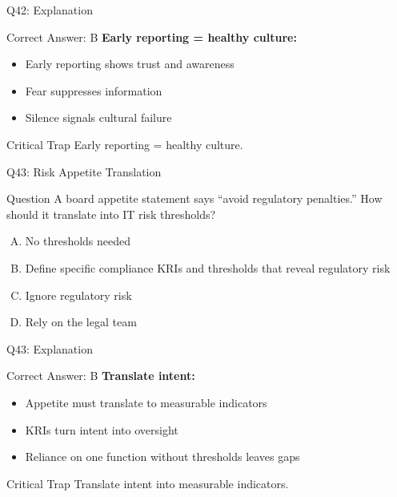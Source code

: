 \documentclass{beamer}
\begin{document}
	\begin{frame}{Q42: Explanation}
		\begin{block}{Correct Answer: B}
			\textbf{Early reporting = healthy culture:}
			\begin{itemize}
				\item Early reporting shows trust and awareness
				\item Fear suppresses information
				\item Silence signals cultural failure
			\end{itemize}
		\end{block}
		\begin{alertblock}{Critical Trap}
			Early reporting = healthy culture.
		\end{alertblock}
	\end{frame}
	
	\begin{frame}{Q43: Risk Appetite Translation}
		\begin{block}{Question}
			A board appetite statement says ``avoid regulatory penalties.'' How should it translate into IT risk thresholds?
		\end{block}
		\begin{enumerate}[(A)]
			\item No thresholds needed
			\item Define specific compliance KRIs and thresholds that reveal regulatory risk
			\item Ignore regulatory risk
			\item Rely on the legal team
		\end{enumerate}
	\end{frame}
	
	\begin{frame}{Q43: Explanation}
		\begin{block}{Correct Answer: B}
			\textbf{Translate intent:}
			\begin{itemize}
				\item Appetite must translate to measurable indicators
				\item KRIs turn intent into oversight
				\item Reliance on one function without thresholds leaves gaps
			\end{itemize}
		\end{block}
		\begin{alertblock}{Critical Trap}
			Translate intent into measurable indicators.
		\end{alertblock}
	\end{frame}
	
\end{document}
